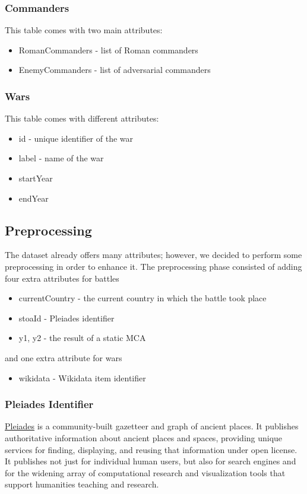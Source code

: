 \subsubsection{Commanders}
This table comes with two main attributes:
\begin{itemize}
    \item RomanCommanders - list of Roman commanders
    \item EnemyCommanders - list of adversarial commanders
\end{itemize}

\subsubsection{Wars}
This table comes with different attributes:
\begin{itemize}
    \item id - unique identifier of the war
    \item label - name of the war
    \item startYear
    \item endYear
\end{itemize}

\subsection{Preprocessing}
The dataset already offers many attributes; however, we decided to perform some preprocessing in order to enhance it. The preprocessing phase consisted of adding four extra attributes for battles
\begin{itemize}
    \item currentCountry - the current country in which the battle took place
    \item stoaId - Pleiades identifier
    \item y1, y2 - the result of a static MCA
\end{itemize}

and one extra attribute for wars
\begin{itemize}
    \item wikidata - Wikidata item identifier
\end{itemize}

\subsubsection{Pleiades Identifier}
\href{https://pleiades.stoa.org}{Pleiades} is a community-built gazetteer and graph of ancient places. It publishes authoritative information about ancient places and spaces, providing unique services for finding, displaying, and reusing that information under open license. It publishes not just for individual human users, but also for search engines and for the widening array of computational research and visualization tools that support humanities teaching and research.

